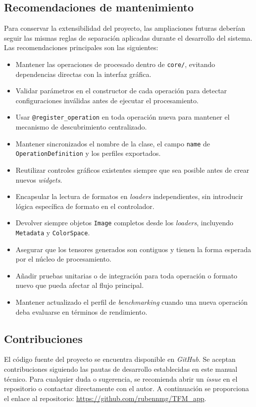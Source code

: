 \newpage

\subsection{Recomendaciones de mantenimiento}

Para conservar la extensibilidad del proyecto, las ampliaciones futuras deberían
seguir las mismas reglas de separación aplicadas durante el desarrollo del
sistema. Las recomendaciones principales son las siguientes:

\begin{itemize}[noitemsep]
    \item Mantener las operaciones de procesado dentro de \texttt{core/}, evitando dependencias directas con la interfaz gráfica.
    \item Validar parámetros en el constructor de cada operación para detectar configuraciones inválidas antes de ejecutar el procesamiento.
    \item Usar \texttt{@register\_operation} en toda operación nueva para mantener el mecanismo de descubrimiento centralizado.
    \item Mantener sincronizados el nombre de la clase, el campo \texttt{name} de \texttt{OperationDefinition} y los perfiles exportados.
    \item Reutilizar controles gráficos existentes siempre que sea posible antes de crear nuevos \textit{widgets}.
    \item Encapsular la lectura de formatos en \textit{loaders} independientes, sin introducir lógica específica de formato en el controlador.
    \item Devolver siempre objetos \texttt{Image} completos desde los \textit{loaders}, incluyendo \texttt{Metadata} y \texttt{ColorSpace}.
    \item Asegurar que los tensores generados son contiguos y tienen la forma esperada por el núcleo de procesamiento.
    \item Añadir pruebas unitarias o de integración para toda operación o formato nuevo que pueda afectar al flujo principal.
    \item Mantener actualizado el perfil de \textit{benchmarking} cuando una nueva operación deba evaluarse en términos de rendimiento.
\end{itemize}

\subsection{Contribuciones}
El código fuente del proyecto se encuentra disponible en \textit{GitHub}. Se aceptan contribuciones siguiendo las pautas de desarrollo establecidas en este 
manual técnico. Para cualquier duda o sugerencia, se recomienda abrir un \textit{issue} en el repositorio o contactar directamente con el autor.
A continuación se proporciona el enlace al repositorio: \url{https://github.com/rubennmg/TFM_app}.
